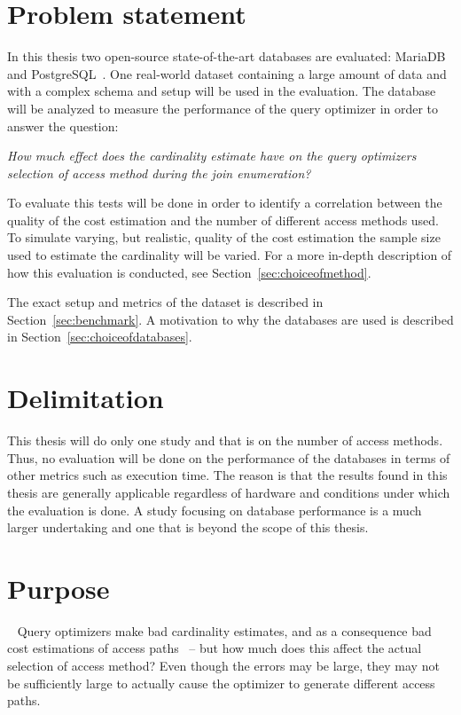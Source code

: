 \section{Problem statement}
In this thesis two open-source state-of-the-art databases are evaluated:
MariaDB~\cite{mariadb_m} and PostgreSQL~\cite{postgresql_ptwmaosd}. One
real-world dataset containing a large amount of data and with a complex schema
and setup will be used in the evaluation. The database will be analyzed to
measure the performance of the query optimizer in order to answer the question:

\textit{How much effect does the cardinality estimate have on the query optimizers
  selection of access method during the join enumeration?}

To evaluate this tests will be done in order to identify a correlation between
the quality of the cost estimation and the number of different access methods
used. To simulate varying, but realistic, quality of the cost estimation the
sample size used to estimate the cardinality will be varied. For a more in-depth
description of how this evaluation is conducted, see Section~\ref{sec:choiceofmethod}.

The exact setup and metrics of the dataset is described in
Section~\ref{sec:benchmark}. A motivation to why the databases are used is
described in Section~\ref{sec:choiceofdatabases}.

\section{Delimitation}
This thesis will do only one study and that is on the number of access methods.
Thus, no evaluation will be done on the performance of the databases in terms of
other metrics such as execution time. The reason is that the results found in
this thesis are generally applicable regardless of hardware and conditions under
which the evaluation is done. A study focusing on database performance is a much
larger undertaking and one that is beyond the scope of this thesis.

\section{Purpose}~\label{sec:purpose}
Query optimizers make bad cardinality estimates, and as a consequence bad cost
estimations of access paths~\cite{leis_2015_how_hgaqor} – but how much does this
affect the actual selection of access method? Even though the errors may be large,
they may not be sufficiently large to actually cause the optimizer to generate
different access paths.

